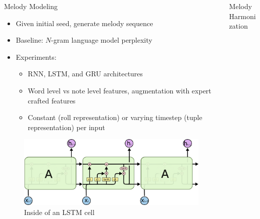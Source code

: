 \documentclass[final]{beamer}
\newlength{\onecolwid}
\newlength{\twocolwid}
\begin{document}
\begin{frame}[t]
\begin{columns}[t]
\begin{column}{\twocolwid}
\begin{columns}[t,totalwidth=\twocolwid]
\begin{column}{\onecolwid}
\begin{block}{Melody Modeling}
  \begin{itemize}
    \item Given initial seed, generate melody sequence
    \item Baseline: $N$-gram language model perplexity
    \item Experiments:
      \begin{itemize}
        \item RNN, LSTM, and GRU architectures
        \item Word level vs note level features, augmentation with expert crafted features
        \item Constant (roll representation) or varying timestep (tuple representation) per input
      \end{itemize}
  \end{itemize}
\end{block}

\begin{figure}
  \includegraphics[width=0.8\linewidth]{Figures/LSTM3-chain.png}
  \caption{Inside of an LSTM cell\cite{DBLP:conf/asru/2013}}
\end{figure}


\end{column} %

\begin{column}{\onecolwid}\vspace{-.6in} %


\begin{block}{Melody Harmonization}


\end{block}
\end{column}
\end{columns}
\end{column}
\end{columns}
\end{frame}
\end{document}
